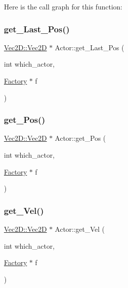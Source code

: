 Here is the call graph for this function\+:
\mbox{\label{namespace_actor_a3b1e7a688fd053cc585b45fcfac99e8e}} 
\subsubsection{\texorpdfstring{get\+\_\+\+Last\+\_\+\+Pos()}{get\_Last\_Pos()}}
{\footnotesize\ttfamily \mbox{\hyperlink{struct_vec2_d_1_1_vec2_d}{Vec2\+D\+::\+Vec2D}} $\ast$ Actor\+::get\+\_\+\+Last\+\_\+\+Pos (\begin{DoxyParamCaption}\item[{int}]{which\+\_\+actor,  }\item[{\mbox{\hyperlink{struct_actor_1_1_factory}{Factory}} $\ast$}]{f }\end{DoxyParamCaption})}

\mbox{\label{namespace_actor_a7594fa0d4d2edd3dd8a2f5aeebe70f97}} 
\subsubsection{\texorpdfstring{get\+\_\+\+Pos()}{get\_Pos()}}
{\footnotesize\ttfamily \mbox{\hyperlink{struct_vec2_d_1_1_vec2_d}{Vec2\+D\+::\+Vec2D}} $\ast$ Actor\+::get\+\_\+\+Pos (\begin{DoxyParamCaption}\item[{int}]{which\+\_\+actor,  }\item[{\mbox{\hyperlink{struct_actor_1_1_factory}{Factory}} $\ast$}]{f }\end{DoxyParamCaption})}

\mbox{\label{namespace_actor_ab6c8bbeea8014b7b90d8902527961e2d}} 
\subsubsection{\texorpdfstring{get\+\_\+\+Vel()}{get\_Vel()}}
{\footnotesize\ttfamily \mbox{\hyperlink{struct_vec2_d_1_1_vec2_d}{Vec2\+D\+::\+Vec2D}} $\ast$ Actor\+::get\+\_\+\+Vel (\begin{DoxyParamCaption}\item[{int}]{which\+\_\+actor,  }\item[{\mbox{\hyperlink{struct_actor_1_1_factory}{Factory}} $\ast$}]{f }\end{DoxyParamCaption})}

